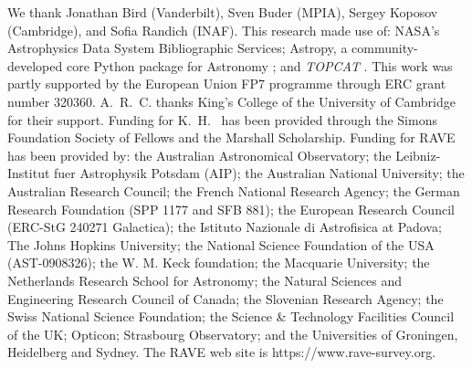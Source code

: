\documentclass[preprint,trackchanges]{aastex}
\newcommand{\project}[1]{\textsl{#1}}
\begin{document}
\acknowledgements
We thank 
	Jonathan Bird (Vanderbilt),
	Sven Buder (MPIA), 
	Sergey Koposov (Cambridge),
and 
	Sofia Randich (INAF).
This research made use of: 
  	NASA's Astrophysics Data System Bibliographic Services;
  	Astropy, a community-developed core Python package for Astronomy \citep{astropy};
and 
  	\project{TOPCAT} \citep{Taylor_2005}.
This work was partly supported by the European Union FP7 programme through ERC 
grant number 320360. A.~R.~C. thanks King's College of the University of Cambridge
for their support.  Funding for K.~H.~ has been provided through the Simons 
Foundation Society of Fellows and the Marshall Scholarship.
Funding for RAVE has been provided by: the Australian Astronomical Observatory; 
the Leibniz-Institut fuer Astrophysik Potsdam (AIP); the Australian National 
University; the Australian Research Council; the French National Research Agency;
the German Research Foundation (SPP 1177 and SFB 881); the European Research 
Council (ERC-StG 240271 Galactica); the Istituto Nazionale di Astrofisica at 
Padova; The Johns Hopkins University; the National Science Foundation of the USA
(AST-0908326); the W. M. Keck foundation; the Macquarie University; the 
Netherlands Research School for Astronomy; the Natural Sciences and Engineering 
Research Council of Canada; the Slovenian Research Agency; the Swiss National 
Science Foundation; the Science \& Technology Facilities Council of the UK; 
Opticon; Strasbourg Observatory; and the Universities of Groningen, Heidelberg 
and Sydney. The RAVE web site is https://www.rave-survey.org.  
\end{document}
